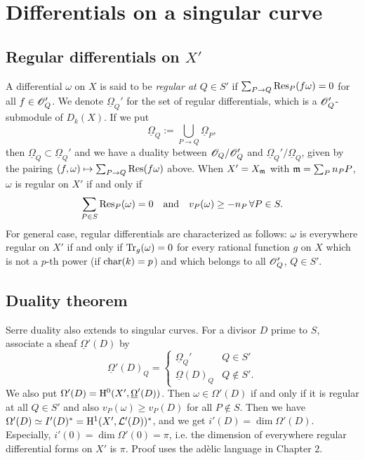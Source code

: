 \documentclass[letterpaper, 12pt]{article}
\begin{document}
\section{Differentials on a singular curve}


\subsection{Regular differentials on $X'$}

A differential $\omega$ on $X$ is said to be \emph{regular at $Q \in S'$} if $\sum_{P \to Q} \mathrm{Res}_P(f\omega) = 0$ for all $f \in \mathscr{O}_Q'$.
We denote $\underline{\Omega}_Q'$ for the set of regular differentials, which is a $\mathscr{O}_Q'$-submodule of $D_k(X)$.
If we put
$$
\underline{\Omega}_Q := \bigcup_{P \to Q} \underline{\Omega}_P,
$$
then $\underline{\Omega}_Q \subset \underline{\Omega}_Q'$ and we have a duality between $\mathscr{O}_Q / \mathscr{O}_Q'$ and $\underline{\Omega}_Q' / \underline{\Omega}_Q$, given by the pairing $(f, \omega) \mapsto \sum_{P \to Q} \mathrm{Res}(f\omega)$ above.
When $X' = X_{\mathfrak{m}}$ with $\mathfrak{m} = \sum_P n_P P$, $\omega$ is regular on $X'$ if and only if
$$
\sum_{P \in S} \mathrm{Res}_P(\omega) = 0 \quad\text{and}\quad v_P(\omega) \ge -n_P\,\forall P \in S.
$$
For general case, regular differentials are characterized as follows: $\omega$ is everywhere regular on $X'$ if and only if $\mathrm{Tr}_g(\omega) = 0$ for every rational function $g$ on $X$ which is not a $p$-th power (if $\mathrm{char} (k) = p$) and which belongs to all $\mathscr{O}_Q'$, $Q \in S'$.


\subsection{Duality theorem}

Serre duality also extends to singular curves.
For a divisor $D$ prime to $S$, associate a sheaf $\underline{\Omega}'(D)$ by
$$
\underline{\Omega}'(D)_Q = \begin{cases}
    \underline{\Omega}_Q' & Q \in S' \\ \underline{\Omega}(D)_Q & Q \not \in S'.
\end{cases}
$$
We also put $\Omega'(D) = \mathrm{H}^0(X', \underline{\Omega}'(D))$.
Then $\omega \in \Omega'(D)$ if and only if it is regular at all $Q \in S'$ and also $v_P(\omega) \ge v_P(D)$ for all $P \not \in S$.
Then we have $\Omega'(D) \simeq I'(D)^\ast = \mathrm{H}^1(X', \mathcal{L}'(D))^\ast$, and we get $i'(D) = \dim \Omega'(D)$.
Especially, $i'(0) = \dim\Omega'(0) = \pi$, i.e. the dimension of everywhere regular differential forms on $X'$ is $\pi$.
Proof uses the ad\`elic language in Chapter 2.
\end{document}
